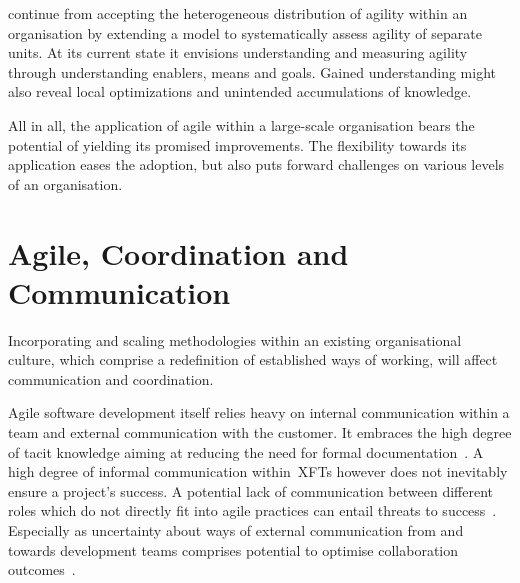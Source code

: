 \citet{kettunen2008agileorg} continue from accepting the heterogeneous distribution of agility within an organisation by extending a model to systematically assess agility of separate units. At its current state it envisions understanding and measuring agility through understanding enablers, means and goals. Gained understanding might also reveal local optimizations and unintended accumulations of knowledge.

All in all, the application of agile within a large-scale organisation bears the potential of yielding its promised improvements. The flexibility towards its application eases the adoption, but also puts forward challenges on various levels of an organisation. 

\section{Agile, Coordination and Communication}

Incorporating and scaling methodologies within an existing organisational culture, which comprise a redefinition of established ways of working, will affect communication and coordination.

Agile software development itself relies heavy on internal communication within a team and external communication with the customer. It embraces the high degree of tacit knowledge aiming at reducing the need for formal documentation~\citep{beck2001agile}. A high degree of informal communication within~\acs{XFT}s however does not inevitably ensure a project's success. A potential lack of communication between different roles which do not directly fit into agile practices can entail threats to success~\citep{coram2005impactagileprojman}. Especially as uncertainty about ways of external communication from and towards development teams comprises potential to optimise collaboration outcomes~\citep{svensson2005viewsagilecollaboartion}.


